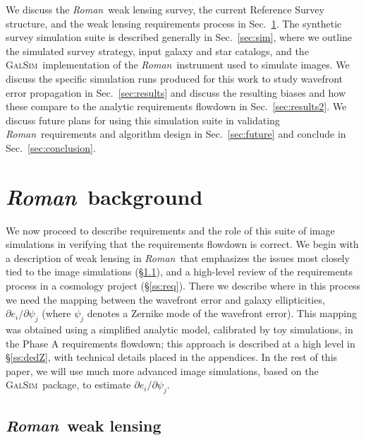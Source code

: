 \documentclass[usenatbib]{mnras}
\newcommand{\galsim}{\textsc{GalSim}}
\newcommand{\wfirst}{{\slshape Roman}}
\begin{document}
We discuss the \wfirst\ weak lensing survey, the current Reference Survey structure, and the weak lensing requirements process in Sec.~\ref{sec:wfirst}. The  synthetic survey simulation suite is described generally in Sec.~\ref{sec:sim}, where we outline the simulated survey strategy, input galaxy and star catalogs, and the \galsim\ implementation of the \wfirst\ instrument used to simulate images. We discuss the specific simulation runs produced for this work to study wavefront error propagation in Sec.~\ref{sec:results} and discuss the resulting biases and how these compare to the analytic requirements flowdown in Sec.~\ref{sec:results2}. We discuss future plans for using this simulation suite in validating \wfirst\ requirements and algorithm design in Sec.~\ref{sec:future} and conclude in Sec.~\ref{sec:conclusion}. 

\section{\wfirst\ background}
\label{sec:wfirst}

We now proceed to describe requirements and the role of this suite of image simulations in verifying that the requirements flowdown is correct. We begin with a description of weak lensing in \wfirst\ that emphasizes the issues most closely tied to the image simulations (\S\ref{ss:wlprog}), and a high-level review of the requirements process in a cosmology project (\S\ref{ss:req}). There we describe where in this process we need the mapping between the wavefront error and galaxy ellipticities, $\partial e_i/\partial \psi_j$ (where $\psi_j$ denotes a Zernike mode of the wavefront error). This mapping was obtained using a simplified analytic model, calibrated by toy simulations, in the Phase A requirements flowdown; this approach is described at a high level in \S\ref{ss:dedZ}, with technical details placed in the appendices. In the rest of this paper, we will use much more advanced image simulations, based on the \galsim\ package, to estimate $\partial e_i/\partial \psi_j$.

\subsection{\wfirst\ weak lensing}
\label{ss:wlprog}
\end{document}

